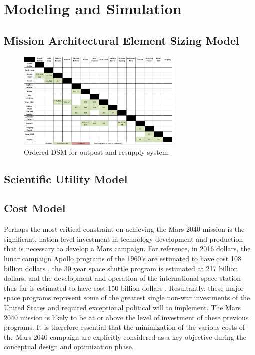 \documentclass[]{aiaa-pretty}
\begin{document}
\section{Modeling and Simulation}
\label{sec:model}

\subsection{Mission Architectural Element Sizing Model}
\begin{figure}[h!]
	\centering
	\includegraphics[width=0.7\textwidth]{OrderedDSM}
	\caption{Ordered DSM for outpost and resupply system.}
	\label{fig:orderedDSM}
\end{figure}


\subsection{Scientific Utility Model}

\subsection{Cost Model}
Perhaps the most critical constraint on achieving the Mars 2040 mission is the significant, nation-level investment in technology development and production that is necessary to develop a Mars campaign. For reference, in 2016 dollars, the lunar campaign Apollo programs of the 1960’s are estimated to have cost 108 billion dollars \cite{stine2008crs}, the 30 year space shuttle program is estimated at 217 billion dollars, and the development and operation of the international space station thus far is estimated to have cost 150 billion dollars \cite{lafleur2010costs}. Resultantly, these major space programs represent some of the greatest single non-war investments of the United States and required exceptional political will to implement. The Mars 2040 mission is likely to be at or above the level of investment of these previous programs. It is therefore essential that the minimization of the various costs of the Mars 2040 campaign are explicitly considered as a key objective during the conceptual design and optimization phase.
\end{document}
